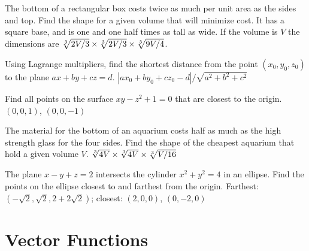 \begin{multicols}{2}
\problem The bottom of a rectangular box costs twice as much per unit area %
as the sides and top. Find the shape for a given volume that will minimize
cost.  \answer It has a square base, and is one and one half times as tall
as wide.  If the volume is $V$ the dimensions are $\root 3 \of {2V/3}\times
\root 3 \of {2V/3}\times \root 3\of {9V/4}$.
\endanswer

\problem Using Lagrange multipliers, find the shortest distance from the %
point $(x_0,y_0,z_0)$ to the plane $ax+by+cz=d$.  \answer
$|ax_0+by_0+cz_0-d|/\sqrt{a^2+b^2+c^2}$
\endanswer

\problem Find all points on the surface $xy-z^2+1=0$ that are closest to %
the origin.  \answer $(0,0,1)$, $(0,0,-1)$
\endanswer

\problem The material for the bottom of an aquarium costs half as much as %
the high strength glass for the four sides. Find the shape of the cheapest
aquarium that hold a given volume $V$.  \answer $\root 3\of{4V}\times\root
3\of{4V}\times\root 3\of{V/16}$
\endanswer

\problem The plane $x-y+z=2$ intersects the cylinder $x^2+y^2=4$ in an %
ellipse. Find the points on the ellipse closest to and farthest from the
origin.  \answer Farthest: $(-\sqrt2,\sqrt2,2+2\sqrt2)$; closest:
$(2,0,0)$, $(0,-2,0)$
\endanswer

\end{multicols}
\section{Vector Functions} %

